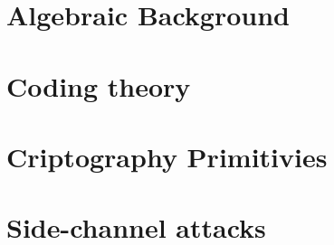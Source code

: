 \section{Algebraic Background}
\section{Coding theory}
\section{Criptography Primitivies}
\section{Side-channel attacks}